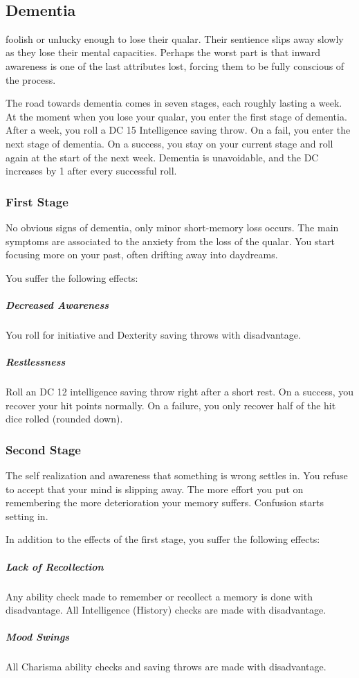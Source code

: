 
\pagebreak~
\vspace{11.5cm}

\subsection*{Dementia} \label{ssec::dementia}
foolish or unlucky enough to lose their qualar.
Their sentience slips away slowly as they lose their mental capacities.
Perhaps the worst part is that inward awareness is one of the last attributes lost, forcing them to be fully conscious of the process.

The road towards dementia comes in seven stages, each roughly lasting a week.
At the moment when you lose your qualar, you enter the first stage of dementia.
After a week, you roll a DC 15 Intelligence saving throw.
On a fail, you enter the next stage of dementia.
On a success, you stay on your current stage and roll again at the start of the next week.
Dementia is unavoidable, and the DC increases by 1 after every successful roll.

\subsubsection{First Stage}
    No obvious signs of dementia, only minor short-memory loss occurs.
    The main symptoms are associated to the anxiety from the loss of the qualar.
    You start focusing more on your past, often drifting away into daydreams.

    You suffer the following effects:
    \subparagraph{Decreased Awareness} You roll for initiative and Dexterity saving throws with disadvantage.
    \subparagraph{Restlessness} Roll an DC 12 intelligence saving throw right after a short rest.
    On a success, you recover your hit points normally.
    On a failure, you only recover half of the hit dice rolled (rounded down).

\subsubsection{Second Stage}
    The self realization and awareness that something is wrong settles in.
    You refuse to accept that your mind is slipping away.
    The more effort you put on remembering the more deterioration your memory suffers.
    Confusion starts setting in.

    In addition to the effects of the first stage, you suffer the following effects:
    \subparagraph{Lack of Recollection} Any ability check made to remember or recollect a memory is done with disadvantage.
    All Intelligence (History) checks are made with disadvantage.
    \subparagraph{Mood Swings} All Charisma ability checks and saving throws are made with disadvantage.

